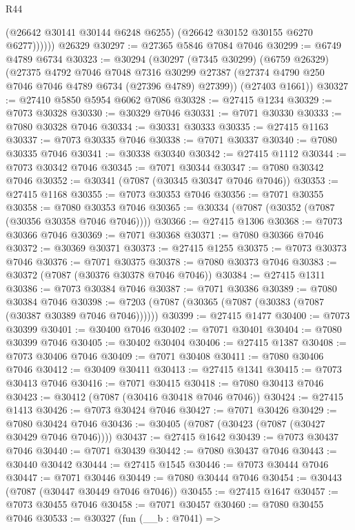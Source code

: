 \begin{lexlean}{R44}
\begin{coremodule}
{              (@26642 @30141 @30144 @6248 @6255)
              (@26642 @30152 @30155 @6270 @6277))))))
    @26329
@30297 := @27365 @5846 @7084 @7046
@30299 := @6749 @4789 @6734
@30323 := @30294
    (@30297
      (@7345 @30299)
      (@6759 @26329)
      (@27375
        @4792
        @7046
        @7048
        @7316
        @30299
        @27387
        (@27374 @4790 @250 @7046 @7046 @4789 @6734 (@27396 @4789) @27399))
      (@27403 @1661))
@30327 := @27410 @5850 @5954 @6062 @7086
@30328 := @27415 @1234
@30329 := @7073 @30328
@30330 := @30329 @7046
@30331 := @7071 @30330
@30333 := @7080 @30328 @7046
@30334 := @30331 @30333
@30335 := @27415 @1163
@30337 := @7073 @30335 @7046
@30338 := @7071 @30337
@30340 := @7080 @30335 @7046
@30341 := @30338 @30340
@30342 := @27415 @1112
@30344 := @7073 @30342 @7046
@30345 := @7071 @30344
@30347 := @7080 @30342 @7046
@30352 := @30341 (@7087 (@30345 @30347 @7046 @7046))
@30353 := @27415 @1168
@30355 := @7073 @30353 @7046
@30356 := @7071 @30355
@30358 := @7080 @30353 @7046
@30365 := @30334 (@7087 (@30352 (@7087 (@30356 @30358 @7046 @7046))))
@30366 := @27415 @1306
@30368 := @7073 @30366 @7046
@30369 := @7071 @30368
@30371 := @7080 @30366 @7046
@30372 := @30369 @30371
@30373 := @27415 @1255
@30375 := @7073 @30373 @7046
@30376 := @7071 @30375
@30378 := @7080 @30373 @7046
@30383 := @30372 (@7087 (@30376 @30378 @7046 @7046))
@30384 := @27415 @1311
@30386 := @7073 @30384 @7046
@30387 := @7071 @30386
@30389 := @7080 @30384 @7046
@30398 := @7203 (@7087 (@30365 (@7087 (@30383 (@7087 (@30387 @30389 @7046 @7046))))))
@30399 := @27415 @1477
@30400 := @7073 @30399
@30401 := @30400 @7046
@30402 := @7071 @30401
@30404 := @7080 @30399 @7046
@30405 := @30402 @30404
@30406 := @27415 @1387
@30408 := @7073 @30406 @7046
@30409 := @7071 @30408
@30411 := @7080 @30406 @7046
@30412 := @30409 @30411
@30413 := @27415 @1341
@30415 := @7073 @30413 @7046
@30416 := @7071 @30415
@30418 := @7080 @30413 @7046
@30423 := @30412 (@7087 (@30416 @30418 @7046 @7046))
@30424 := @27415 @1413
@30426 := @7073 @30424 @7046
@30427 := @7071 @30426
@30429 := @7080 @30424 @7046
@30436 := @30405 (@7087 (@30423 (@7087 (@30427 @30429 @7046 @7046))))
@30437 := @27415 @1642
@30439 := @7073 @30437 @7046
@30440 := @7071 @30439
@30442 := @7080 @30437 @7046
@30443 := @30440 @30442
@30444 := @27415 @1545
@30446 := @7073 @30444 @7046
@30447 := @7071 @30446
@30449 := @7080 @30444 @7046
@30454 := @30443 (@7087 (@30447 @30449 @7046 @7046))
@30455 := @27415 @1647
@30457 := @7073 @30455 @7046
@30458 := @7071 @30457
@30460 := @7080 @30455 @7046
@30533 := @30327
    (fun (__b : @7041) =>
}
\end{coremodule}
\end{lexlean}
